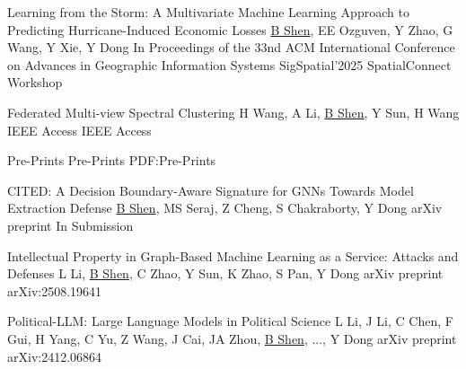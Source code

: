 \BigGap
\NumberedItem{[2]}
{\PaperEntry
    {Learning from the Storm: A Multivariate Machine Learning Approach to Predicting Hurricane-Induced Economic Losses}
    {\underline{B Shen}, EE Ozguven, Y Zhao, G Wang, Y Xie, Y Dong}
    {In Proceedings of the 33nd ACM International Conference on Advances in Geographic Information Systems}
    {SigSpatial'2025 SpatialConnect Workshop}
    {}
}

\BigGap
\NumberedItem{[1]}
{\PaperEntry
    {Federated Multi-view Spectral Clustering}
    {H Wang, A Li, \underline{B Shen}, Y Sun, H Wang}
    {IEEE Access}
    {IEEE Access}
    {}
}

 
\endgroup











\BigGap


\SubSection
{Pre-Prints}
{Pre-Prints}
{PDF:Pre-Prints}

\begingroup
\renewcommand{\MaxNumberedItem}{[99]}





\BigGap
\NumberedItem{[3]}
{\PaperEntry
    {CITED: A Decision Boundary-Aware Signature for GNNs Towards Model Extraction Defense}
    {\underline{B Shen}, MS Seraj, Z Cheng, S Chakraborty, Y Dong}
    {arXiv preprint}
    {In Submission}
    {}
}


\BigGap
\NumberedItem{[2]}
{\PaperEntry
    {Intellectual Property in Graph-Based Machine Learning as a Service: Attacks and Defenses}
    {L Li, \underline{B Shen}, C Zhao, Y Sun, K Zhao, S Pan, Y Dong}
    {arXiv preprint}
    {arXiv:2508.19641}
    {}
}


\BigGap
\NumberedItem{[1]}
{\PaperEntry
    {Political-LLM: Large Language Models in Political Science}
    {L Li, J Li, C Chen, F Gui, H Yang, C Yu, Z Wang, J Cai, JA Zhou, \underline{B Shen}, ..., Y Dong}
    {arXiv preprint}
    {arXiv:2412.06864}
    {}
}

\endgroup
